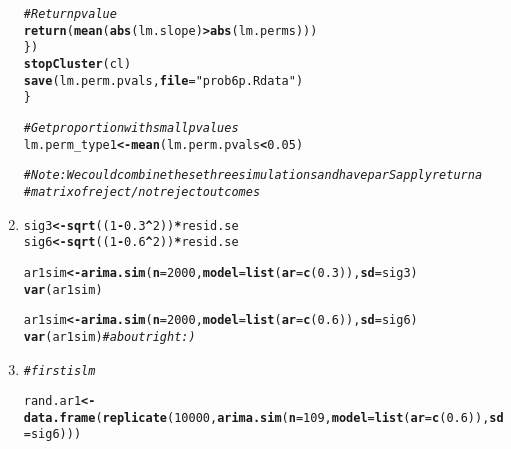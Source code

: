 \documentclass[11pt]{article}\usepackage[]{graphicx}\usepackage[]{color}
\makeatletter
\newcommand{\hlnum}[1]{\textcolor[rgb]{0,0,0}{#1}}%
\newcommand{\hlstr}[1]{\textcolor[rgb]{0,0,0}{#1}}%
\newcommand{\hlcom}[1]{\textcolor[rgb]{0.4,0.4,0.4}{\textit{#1}}}%
\newcommand{\hlopt}[1]{\textcolor[rgb]{0,0,0}{\textbf{#1}}}%
\newcommand{\hlstd}[1]{\textcolor[rgb]{0,0,0}{#1}}%
\newcommand{\hlkwb}[1]{\textcolor[rgb]{0,0,0}{\textbf{#1}}}%
\newcommand{\hlkwc}[1]{\textcolor[rgb]{0,0,0}{\textbf{#1}}}%
\newcommand{\hlkwd}[1]{\textcolor[rgb]{0,0,0}{\textbf{#1}}}%
\newenvironment{kframe}{%
 \def\at@end@of@kframe{}%
 \ifinner\ifhmode%
  \def\at@end@of@kframe{\end{minipage}}%
  \begin{minipage}{\columnwidth}%
 \fi\fi%
 \def\FrameCommand##1{\hskip\@totalleftmargin \hskip-\fboxsep
 \colorbox{shadecolor}{##1}\hskip-\fboxsep
     \hskip-\linewidth \hskip-\@totalleftmargin \hskip\columnwidth}%
 \MakeFramed {\advance\hsize-\width
   \@totalleftmargin\z@ \linewidth\hsize
   \@setminipage}}%
 {\par\unskip\endMakeFramed%
 \at@end@of@kframe}
\newenvironment{knitrout}{}{} %
\makeatother
\begin{document}
\begin{enumerate}
\begin{knitrout}
\begin{kframe}
\begin{alltt}
    \hlcom{# Return pvalue}
    \hlkwd{return}\hlstd{(}\hlkwd{mean}\hlstd{(}\hlkwd{abs}\hlstd{(lm.slope)} \hlopt{>} \hlkwd{abs}\hlstd{(lm.perms)))}
  \hlstd{\})}
  \hlkwd{stopCluster}\hlstd{(cl)}
  \hlkwd{save}\hlstd{(lm.perm.pvals,} \hlkwc{file} \hlstd{=} \hlstr{"prob6p.Rdata"}\hlstd{)}
\hlstd{\}}

\hlcom{# Get proportion with small pvalues}
\hlstd{lm.perm_type1} \hlkwb{<-} \hlkwd{mean}\hlstd{(lm.perm.pvals} \hlopt{<} \hlnum{0.05}\hlstd{)}


\hlcom{# Note: We could combine these three simulations and have parSapply return a}
\hlcom{# matrix of reject/not reject outcomes}
\end{alltt}
\end{kframe}
\end{knitrout}
\item%
\begin{knitrout}\footnotesize
{}\color{fgcolor}\begin{kframe}
\begin{alltt}
\hlstd{sig3} \hlkwb{<-} \hlkwd{sqrt}\hlstd{((}\hlnum{1}\hlopt{-}\hlnum{0.3}\hlopt{^}\hlnum{2}\hlstd{))} \hlopt{*} \hlstd{resid.se}
\hlstd{sig6} \hlkwb{<-} \hlkwd{sqrt}\hlstd{((}\hlnum{1}\hlopt{-}\hlnum{0.6}\hlopt{^}\hlnum{2}\hlstd{))} \hlopt{*} \hlstd{resid.se}

\hlstd{ar1sim}\hlkwb{<-}\hlkwd{arima.sim}\hlstd{(}\hlkwc{n}\hlstd{=}\hlnum{2000}\hlstd{,}\hlkwc{model}\hlstd{=}\hlkwd{list}\hlstd{(}\hlkwc{ar}\hlstd{=}\hlkwd{c}\hlstd{(}\hlnum{0.3}\hlstd{)),}\hlkwc{sd}\hlstd{=sig3)}
\hlkwd{var}\hlstd{(ar1sim)}

\hlstd{ar1sim}\hlkwb{<-}\hlkwd{arima.sim}\hlstd{(}\hlkwc{n}\hlstd{=}\hlnum{2000}\hlstd{,}\hlkwc{model}\hlstd{=}\hlkwd{list}\hlstd{(}\hlkwc{ar}\hlstd{=}\hlkwd{c}\hlstd{(}\hlnum{0.6}\hlstd{)),}\hlkwc{sd}\hlstd{=sig6)}
\hlkwd{var}\hlstd{(ar1sim)} \hlcom{# about right :)}
\end{alltt}
\end{kframe}
\end{knitrout}
\item%
\begin{knitrout}\footnotesize
{}\color{fgcolor}\begin{kframe}
\begin{alltt}
\hlcom{# first is lm}

\hlstd{rand.ar1} \hlkwb{<-} \hlkwd{data.frame}\hlstd{(}\hlkwd{replicate}\hlstd{(}\hlnum{10000}\hlstd{,} \hlkwd{arima.sim}\hlstd{(}\hlkwc{n}\hlstd{=}\hlnum{109}\hlstd{,}\hlkwc{model}\hlstd{=}\hlkwd{list}\hlstd{(}\hlkwc{ar}\hlstd{=}\hlkwd{c}\hlstd{(}\hlnum{0.6}\hlstd{)),}\hlkwc{sd}\hlstd{=sig6)))}


\end{alltt}
\end{kframe}
\end{knitrout}
\end{enumerate}
\end{document}
